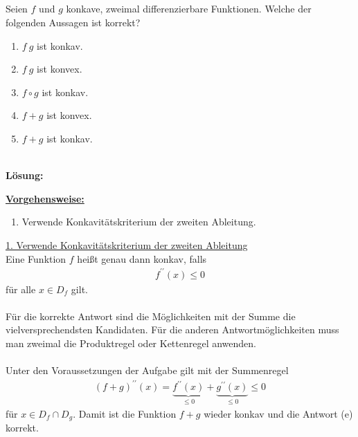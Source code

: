 \subsection*{}
Seien $f$ und $g$ konkave, zweimal differenzierbare Funktionen. Welche der folgenden Aussagen ist korrekt?
\renewcommand{\labelenumi}{(\alph{enumi})}
\begin{enumerate}
	\item 
	$f \ g$ ist konkav.
	\item
	$f \ g$ ist konvex.
	\item
	$f \circ g $ ist konkav.
	\item
	$f +g $ ist konvex.
	\item 
	$f+g$ ist konkav.
\end{enumerate}
\ \\
\textbf{Lösung:}
\begin{mdframed}
\underline{\textbf{Vorgehensweise:}}
\renewcommand{\labelenumi}{\theenumi.}
\begin{enumerate}
\item Verwende Konkavitätskriterium der zweiten Ableitung.
\end{enumerate}
\end{mdframed}

\underline{1. Verwende Konkavitätskriterium der zweiten Ableitung}\\
Eine Funktion $f$ heißt genau dann konkav, falls 
\begin{align*}
	f^{\prime \prime} (x) \leq 0 
\end{align*}
für alle $x \in D_f$ gilt. \\
\\
Für die korrekte Antwort sind die Möglichkeiten mit der Summe die vielversprechendsten Kandidaten. Für die anderen Antwortmöglichkeiten muss man zweimal die Produktregel oder Kettenregel anwenden.\\
\\
Unter den Voraussetzungen der Aufgabe gilt mit der Summenregel
\begin{align*}
	(f +g)^{\prime \prime}(x)  = 
	\underbrace{f^{\prime \prime}(x)}_{\leq 0} + \underbrace{g^{\prime \prime}(x)}_{\leq 0}
	\leq 0
\end{align*}
für $x \in D_f \cap D_g$.
Damit ist die Funktion $f +g$ wieder konkav und die Antwort (e) korrekt.
 



\newpage
